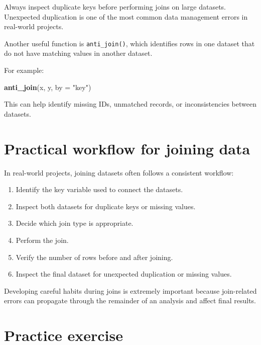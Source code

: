 \documentclass[
  11pt,
  oneside]{book}
\newenvironment{Shaded}{\begin{snugshade}}{\end{snugshade}}
\newcommand{\AttributeTok}[1]{\textcolor[rgb]{0.13,0.29,0.53}{#1}}
\newcommand{\FunctionTok}[1]{\textcolor[rgb]{0.13,0.29,0.53}{\textbf{#1}}}
\newcommand{\NormalTok}[1]{#1}
\newcommand{\StringTok}[1]{\textcolor[rgb]{0.31,0.60,0.02}{#1}}
\providecommand{\tightlist}{%
  \setlength{\itemsep}{0pt}\setlength{\parskip}{0pt}}
\begin{document}
Always inspect duplicate keys before performing joins on large datasets. Unexpected duplication is one of the most common data management errors in real-world projects.

Another useful function is \texttt{anti\_join()}, which identifies rows in one dataset that do not have matching values in another dataset.

For example:

\begin{Shaded}
\begin{Highlighting}[]
\FunctionTok{anti\_join}\NormalTok{(x, y, }\AttributeTok{by =} \StringTok{"key"}\NormalTok{)}
\end{Highlighting}
\end{Shaded}

This can help identify missing IDs, unmatched records, or inconsistencies between datasets.

\section{Practical workflow for joining data}\label{practical-workflow-for-joining-data}

In real-world projects, joining datasets often follows a consistent workflow:

\begin{enumerate}
\def\labelenumi{\arabic{enumi}.}
\tightlist
\item
  Identify the key variable used to connect the datasets.
\item
  Inspect both datasets for duplicate keys or missing values.
\item
  Decide which join type is appropriate.
\item
  Perform the join.
\item
  Verify the number of rows before and after joining.
\item
  Inspect the final dataset for unexpected duplication or missing values.
\end{enumerate}

Developing careful habits during joins is extremely important because join-related errors can propagate through the remainder of an analysis and affect final results.

\section{Practice exercise}\label{practice-exercise-1}
\end{document}
